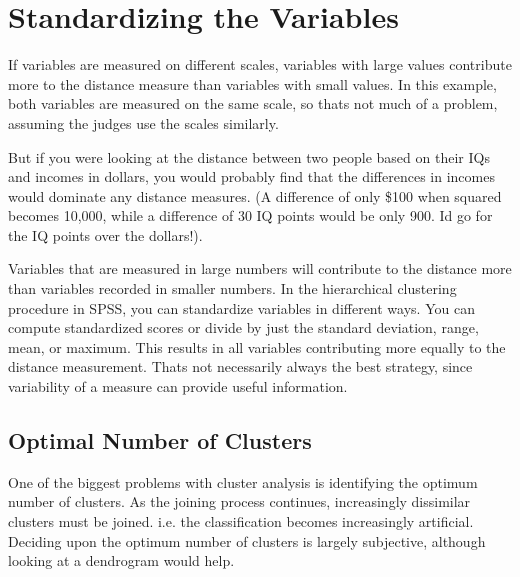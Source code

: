 \section{Standardizing the Variables}
If variables are measured on different scales, variables with large values contribute
more to the distance measure than variables with small values. In this example, both
variables are measured on the same scale, so thats not much of a problem, assuming
the judges use the scales similarly. 

But if you were looking at the distance between two people based on their IQs and incomes in dollars, you would probably find that the
differences in incomes would dominate any distance measures. (A difference of only
\$100 when squared becomes 10,000, while a difference of 30 IQ points would be only
900. Id go for the IQ points over the dollars!).

Variables that are measured in large numbers will contribute to the distance more than variables recorded in smaller
numbers.
In the hierarchical clustering procedure in SPSS, you can standardize variables in
different ways. You can compute standardized scores or divide by just the standard
deviation, range, mean, or maximum. This results in all variables contributing more
equally to the distance measurement. Thats not necessarily always the best strategy,
since variability of a measure can provide useful information. 
\newpage

\subsection{Optimal Number of Clusters}
One of the biggest problems with cluster analysis is identifying the optimum number of
clusters. As the joining process continues, increasingly dissimilar clusters must be joined. i.e. the classification becomes increasingly artificial. Deciding upon the optimum number
of clusters is largely subjective, although looking at a dendrogram would help.
